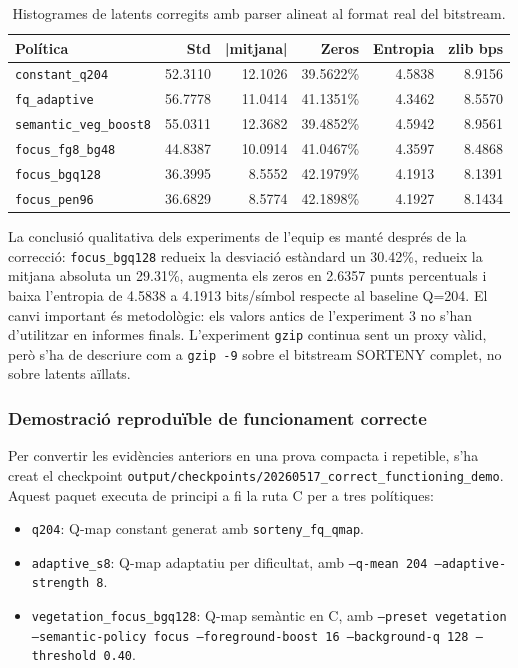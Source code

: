 \documentclass[11pt,a4paper]{article}
\begin{document}
\begin{table}[H]
\centering
\begin{tabular}{lrrrrr}
\toprule
\textbf{Política} & \textbf{Std} & \textbf{|mitjana|} & \textbf{Zeros} & \textbf{Entropia} & \textbf{zlib bps} \\
\midrule
\texttt{constant\_q204} & 52.3110 & 12.1026 & 39.5622\% & 4.5838 & 8.9156 \\
\texttt{fq\_adaptive} & 56.7778 & 11.0414 & 41.1351\% & 4.3462 & 8.5570 \\
\texttt{semantic\_veg\_boost8} & 55.0311 & 12.3682 & 39.4852\% & 4.5942 & 8.9561 \\
\texttt{focus\_fg8\_bg48} & 44.8387 & 10.0914 & 41.0467\% & 4.3597 & 8.4868 \\
\texttt{focus\_bgq128} & 36.3995 & 8.5552 & 42.1979\% & 4.1913 & 8.1391 \\
\texttt{focus\_pen96} & 36.6829 & 8.5774 & 42.1898\% & 4.1927 & 8.1434 \\
\bottomrule
\end{tabular}
\caption{Histogrames de latents corregits amb parser alineat al format real del bitstream.}
\end{table}

La conclusió qualitativa dels experiments de l'equip es manté després de la correcció: \texttt{focus\_bgq128} redueix la desviació estàndard un 30.42\%, redueix la mitjana absoluta un 29.31\%, augmenta els zeros en 2.6357 punts percentuals i baixa l'entropia de 4.5838 a 4.1913 bits/símbol respecte al baseline Q=204. El canvi important és metodològic: els valors antics de l'experiment 3 no s'han d'utilitzar en informes finals. L'experiment \texttt{gzip} continua sent un proxy vàlid, però s'ha de descriure com a \texttt{gzip -9} sobre el bitstream SORTENY complet, no sobre latents aïllats.

\subsubsection{Demostració reproduïble de funcionament correcte}

Per convertir les evidències anteriors en una prova compacta i repetible, s'ha creat el checkpoint \texttt{output/checkpoints/20260517\_correct\_functioning\_demo}. Aquest paquet executa de principi a fi la ruta C per a tres polítiques:

\begin{itemize}
  \item \texttt{q204}: Q-map constant generat amb \texttt{sorteny\_fq\_qmap}.
  \item \texttt{adaptive\_s8}: Q-map adaptatiu per dificultat, amb \texttt{--q-mean 204 --adaptive-strength 8}.
  \item \texttt{vegetation\_focus\_bgq128}: Q-map semàntic en C, amb \texttt{--preset vegetation --semantic-policy focus --foreground-boost 16 --background-q 128 --threshold 0.40}.
\end{itemize}
\end{document}
